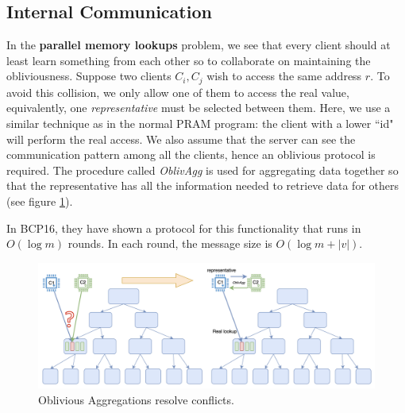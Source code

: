 \documentclass[fontsize=11pt]{article}
\begin{document}
\subsection{Internal Communication}
In the \textbf{parallel memory lookups} problem, we see that every client should at least learn something from each other so to collaborate on maintaining the obliviousness. Suppose two clients $C_i, C_j$ wish to access the same address $r$. To avoid this collision, we only allow one of them to access the real value, equivalently, one \textit{representative} must be selected between them. Here, we use a similar technique as in the normal PRAM program: the client with a lower ``id" will perform the real access. We also assume that the server can see the communication pattern among all the clients, hence an oblivious protocol is required. The procedure called \textit{OblivAgg} is used for aggregating data together so that the representative has all the information needed to retrieve data for others (see figure \ref{fig:OblivAgg}). 
\begin{center}
\end{center}
In BCP16, they have shown a protocol for this functionality that runs in $O(\log m)$ rounds. In each round, the message size is $O(\log m  + |v|)$.

\begin{figure}
    \centering
    \includegraphics[width=0.75\linewidth]{pics/OblivAgg.png}
    \caption{Oblivious Aggregations resolve conflicts.}
    \label{fig:OblivAgg}
\end{figure}
\end{document}
